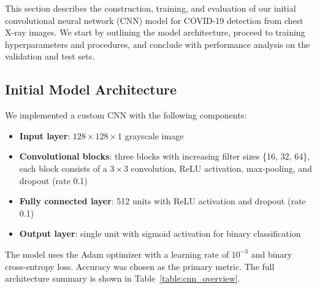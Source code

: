 \documentclass[conference]{IEEEtran}
\begin{document}
This section describes the construction, training, and evaluation of our initial convolutional neural network (CNN) model for COVID-19 detection from chest X-ray images. We start by outlining the model architecture, proceed to training hyperparameters and procedures, and conclude with performance analysis on the validation and test sets.

\subsection{Initial Model Architecture}
We implemented a custom CNN with the following components:
\begin{itemize}
	\item \textbf{Input layer}: $128\times128\times1$ grayscale image
	\item \textbf{Convolutional blocks}: three blocks with increasing filter sizes \{16, 32, 64\}, each block consists of a $3\times3$ convolution, ReLU activation, max-pooling, and dropout (rate 0.1)
	\item \textbf{Fully connected layer}: 512 units with ReLU activation and dropout (rate 0.1)
	\item \textbf{Output layer}: single unit with sigmoid activation for binary classification
\end{itemize}

The model uses the Adam optimizer with a learning rate of $10^{-3}$ and binary cross-entropy loss. Accuracy was chosen as the primary metric. The full architecture summary is shown in Table~\ref{table:cnn_overview}.
\end{document}

